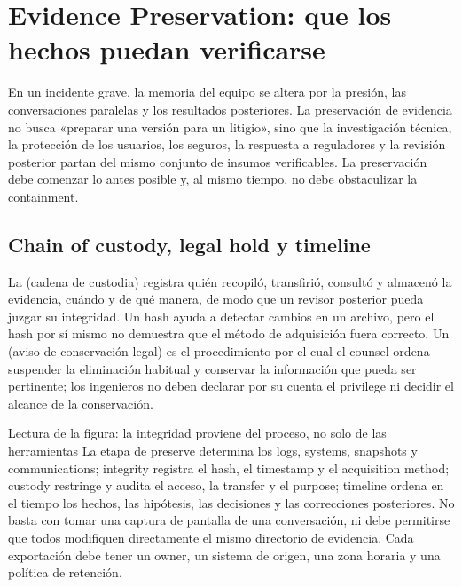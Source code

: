 \section{Evidence Preservation: que los hechos puedan verificarse}

En un incidente grave, la memoria del equipo se altera por la presión, las conversaciones paralelas y los resultados posteriores. La preservación de evidencia no busca «preparar una versión para un litigio», sino que la investigación técnica, la protección de los usuarios, los seguros, la respuesta a reguladores y la revisión posterior partan del mismo conjunto de insumos verificables. La preservación debe comenzar lo antes posible y, al mismo tiempo, no debe obstaculizar la containment.

\subsection{Chain of custody, legal hold y timeline}

La  (cadena de custodia) registra quién recopiló, transfirió, consultó y almacenó la evidencia, cuándo y de qué manera, de modo que un revisor posterior pueda juzgar su integridad. Un hash ayuda a detectar cambios en un archivo, pero el hash por sí mismo no demuestra que el método de adquisición fuera correcto. Un  (aviso de conservación legal) es el procedimiento por el cual el counsel ordena suspender la eliminación habitual y conservar la información que pueda ser pertinente; los ingenieros no deben declarar por su cuenta el privilege ni decidir el alcance de la conservación.


\begin{knowledgebox}{Lectura de la figura: la integridad proviene del proceso, no solo de las herramientas}
La etapa de preserve determina los logs, systems, snapshots y communications; integrity registra el hash, el timestamp y el acquisition method; custody restringe y audita el acceso, la transfer y el purpose; timeline ordena en el tiempo los hechos, las hipótesis, las decisiones y las correcciones posteriores. No basta con tomar una captura de pantalla de una conversación, ni debe permitirse que todos modifiquen directamente el mismo directorio de evidencia. Cada exportación debe tener un owner, un sistema de origen, una zona horaria y una política de retención.
\end{knowledgebox}

